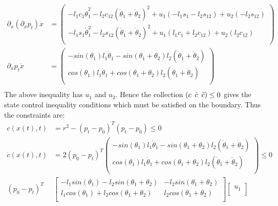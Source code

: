 \begin{enumerate}
\begin{align*}
   \partial_x(\partial_x p_t)\dot x &= \begin{pmatrix}
					-l_1 c_1 \dot \theta_1^2 -l_2 c_{12} (\dot \theta_1 + \dot \theta_2)^2 + u_1 (-l_1 s_1 -
l_2 s_{12}) + u_2 (-l_2 s_{12})\\
					-l_1 s_1 \dot \theta_1^2 -l_2 s_{12} (\dot \theta_1 + \dot \theta_2)^2 + u_1 (l_1 c_1 +
l_2 c_{12}) + u_2 (l_2 c_{12})\\
                                      \end{pmatrix}\\
   \partial_x p_t \dot x &= \begin{pmatrix}
                                  -sin(\theta_1)l_1 \dot \theta_1 - sin(\theta_1 + \theta_2) l_2 (\dot \theta_1 + \dot \theta_2)\\
                                  cos(\theta_1)l_1 \dot \theta_1 + cos(\theta_1 + \theta_2) l_2 (\dot \theta_1 + \dot \theta_2)\\
                                       \end{pmatrix}\\
  \end{align*}
 The above inequality has $u_1$ and $u_2$. Hence the collection $(c \enskip\dot c\enskip \ddot c) \le 0$ gives the state
control inequality conditions which must be satisfied on the boundary. Thus the constraints are:
  \begin{align*}
      c(x(t),t) &= r^2 - (p_t - p_0)^T (p_t - p_0) \le 0 \\
   \dot c(x(t),t) &= 2(p_0 - p_t)^T \begin{pmatrix}
                                  -sin(\theta_1)l_1 \dot \theta_1 - sin(\theta_1 + \theta_2) l_2 (\dot \theta_1 + \dot \theta_2)\\
                                  cos(\theta_1)l_1 \dot \theta_1 + cos(\theta_1 + \theta_2) l_2 (\dot \theta_1 + \dot \theta_2)\\
                                       \end{pmatrix} \le 0\\
    (p_0 - p_t)^T &\begin{bmatrix}
 -l_1 sin(\theta_1) -l_2sin(\theta_1 + \theta_2) & -l_2sin(\theta_1+ \theta_2)\\
  l_1 cos(\theta_1) +  l_2cos(\theta_1 + \theta_2) & l_2cos(\theta_1 + \theta_2)\\
                  \end{bmatrix} 
                  \begin{bmatrix}
                   u_1 \\

\end{bmatrix}
\end{align*}
\end{enumerate}
